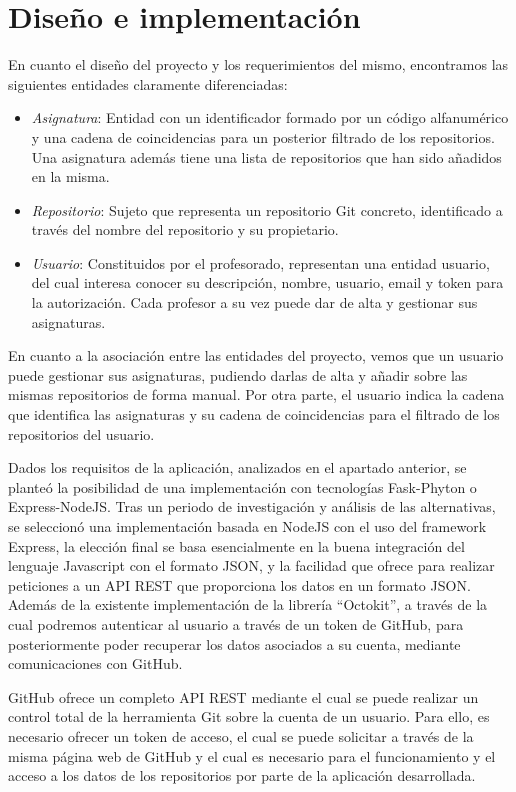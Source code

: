 \chapter{Diseño e implementación\label{05disenoTrabajo}}


En cuanto el diseño del proyecto y los requerimientos del mismo, encontramos las siguientes entidades claramente diferenciadas:
\begin{itemize}
  \item \emph{Asignatura}: Entidad con un identificador formado por un código alfanumérico y una cadena de coincidencias para un posterior filtrado de los repositorios. Una asignatura además tiene una lista de repositorios que han sido añadidos en la misma.
  \item \emph{Repositorio}: Sujeto que representa un repositorio Git concreto, identificado a través del nombre del repositorio y su propietario.
  \item \emph{Usuario}: Constituidos por el profesorado, representan una entidad usuario, del cual interesa conocer su descripción, nombre, usuario, email y token para la autorización. Cada profesor a su vez puede dar de alta y gestionar sus asignaturas.
\end{itemize}

En cuanto a la asociación entre las entidades del proyecto, vemos que un usuario puede gestionar sus asignaturas, pudiendo darlas de alta y añadir sobre las mismas repositorios de forma manual. Por otra parte, el usuario indica la cadena que identifica las asignaturas y su cadena de coincidencias para el filtrado de los repositorios del usuario.

Dados los requisitos de la aplicación, analizados en el apartado anterior, se planteó la posibilidad de una implementación con tecnologías Fask-Phyton o Express-NodeJS. Tras un periodo de investigación y análisis de las alternativas, se seleccionó una implementación basada en NodeJS con el uso del framework Express, la elección final se basa esencialmente en la buena integración del
lenguaje Javascript con el formato JSON, y la facilidad que ofrece para
realizar peticiones a un API REST que proporciona los datos en un formato
JSON. Además de la existente implementación de la librería “Octokit”\cite{Octokit,OctokitDoc}, a través de la cual podremos autenticar al usuario a través de un token de GitHub, para posteriormente poder recuperar los datos asociados a su cuenta, mediante comunicaciones con GitHub.

GitHub ofrece un completo API REST mediante el cual se puede realizar un
control total de la herramienta Git sobre la cuenta de un usuario. Para
ello, es necesario ofrecer un token de acceso, el cual se puede solicitar a
través de la misma página web de GitHub y el cual es necesario para el
funcionamiento y el acceso a los datos de los repositorios por parte de la
aplicación desarrollada.


